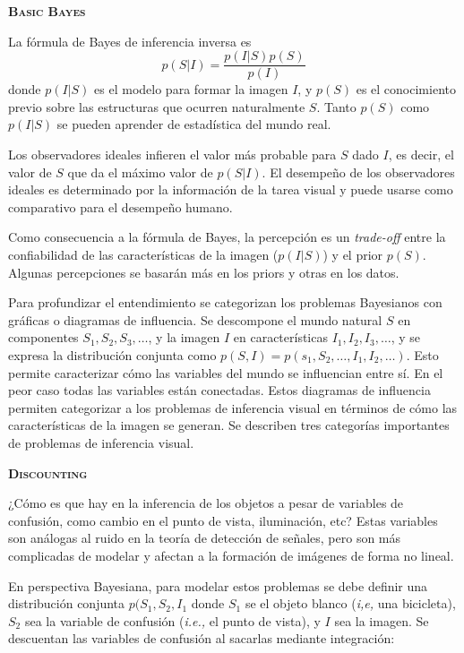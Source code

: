 \documentclass[a4paper,12pt]{article}
\begin{document}
{\scshape\bfseries Basic Bayes}

La fórmula de Bayes de inferencia inversa es
$$
p(S|I) =
\frac{
	p(I|S)p(S)
}{
p(I)
}
$$
donde $p(I|S)$ es el modelo para formar la imagen $I$, y $p(S)$ es el conocimiento previo sobre las estructuras que ocurren naturalmente $S$. Tanto $p(S)$ como $p(I|S)$ se pueden aprender de estadística del mundo real.

Los observadores ideales infieren el valor más probable para $S$ dado $I$, es decir, el valor de $S$ que da el máximo valor de $p(S|I)$. El desempeño de los observadores ideales es determinado por la información de la tarea visual y puede usarse como comparativo para el desempeño humano.

Como consecuencia a la fórmula de Bayes, la percepción es un {\itshape trade-off} entre la confiabilidad de las características de la imagen ($p(I|S)$) y el prior $p(S)$. Algunas percepciones se basarán más en los priors y otras en los datos.

Para profundizar el entendimiento se categorizan los problemas Bayesianos con gráficas o diagramas de influencia. Se descompone el mundo natural $S$ en componentes $S_{1}, S_{2}, S_{3}, \ldots$, y la imagen $I$ en características $I_{1}, I_{2}, I_{3}, \ldots$, y se expresa la distribución conjunta como $p(S,I) = p(s_{1}, S_{2}, \ldots , I_{1}, I_{2},\ldots)$. Esto permite caracterizar cómo las variables del mundo se influencian entre sí. En el peor caso todas las variables están conectadas. Estos diagramas de influencia permiten categorizar a los problemas de inferencia visual en términos de cómo las características de la imagen se generan. Se describen tres categorías importantes de problemas de inferencia visual.

{\scshape\bfseries Discounting}

¿Cómo es que hay en la inferencia de los objetos a pesar de variables de confusión, como cambio en el punto de vista, iluminación, etc? Estas variables son análogas al ruido en la teoría de detección de señales, pero son más complicadas de modelar y afectan a la formación de imágenes de forma no lineal.

En perspectiva Bayesiana, para modelar estos problemas se debe definir una distribución conjunta $p(S_{1}, S_{2}, I_{1}$ donde $S_{1}$ se el objeto blanco ({\itshape i,e,} una bicicleta), $S_{2}$ sea la variable de confusión ({\itshape i.e.,} el punto de vista), y $I$ sea la imagen. Se descuentan las variables de confusión al sacarlas mediante integración:
\end{document}
